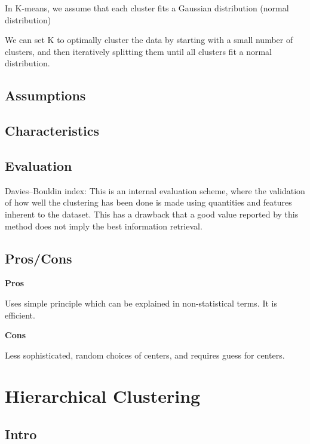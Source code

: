 \documentclass[]{book}
\theoremstyle{definition}
\theoremstyle{definition}
\theoremstyle{definition}
\theoremstyle{remark}
\begin{document}
In K-means, we assume that each cluster fits a Gaussian distribution
(normal distribution)

We can set K to optimally cluster the data by starting with a small
number of clusters, and then iteratively splitting them until all
clusters fit a normal distribution.

\subsection{Assumptions}\label{assumptions-5}

\subsection{Characteristics}\label{characteristics}

\subsection{Evaluation}\label{evaluation-4}

Davies--Bouldin index: This is an internal evaluation scheme, where the
validation of how well the clustering has been done is made using
quantities and features inherent to the dataset. This has a drawback
that a good value reported by this method does not imply the best
information retrieval.

\subsection{Pros/Cons}\label{proscons-5}

\textbf{Pros}

Uses simple principle which can be explained in non-statistical terms.
It is efficient.

\textbf{Cons}

Less sophisticated, random choices of centers, and requires guess for
centers.

\section{Hierarchical Clustering}\label{hierarchical-clustering}

\subsection{Intro}\label{intro-6}
\end{document}
